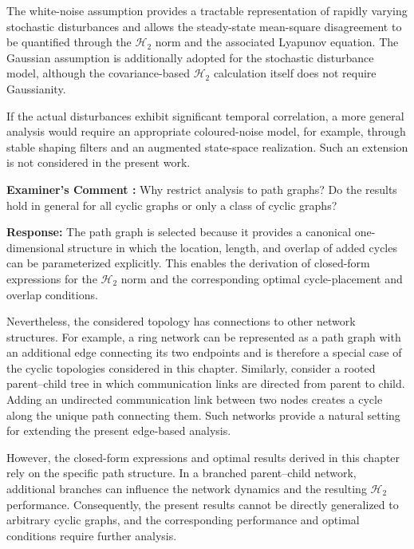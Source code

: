 \documentclass[11pt,a4paper]{article}
\newcounter{examcomment}
\renewcommand{\theexamcomment}{\arabic{examcomment}}
\newcommand{\comment}[1]{%
	\refstepcounter{examcomment}%
	\par\vspace{5pt}\noindent
	\colorbox{gray!13}{%
		\parbox{\dimexpr\linewidth-2\fboxsep}{%
			\textbf{Examiner's Comment \theexamcomment:} #1%
		}%
	}%
	\par
}
\newcounter{problem}
\newcommand{\response}{\par\textbf{Response:} }
\newcommand{\revision}{\par\textbf{Proposed thesis revision:} }
\begin{document}
The white-noise assumption provides a tractable representation of rapidly varying stochastic disturbances and allows the steady-state mean-square disagreement to be quantified through the $\mathcal{H}_2$ norm and the associated Lyapunov equation. The Gaussian assumption is additionally adopted for the stochastic disturbance model, although the covariance-based $\mathcal{H}_2$ calculation itself does not require Gaussianity.

If the actual disturbances exhibit significant temporal correlation, a more general analysis would require an appropriate coloured-noise model, for example, through stable shaping filters and an augmented state-space realization. Such an extension is not considered in the present work.


\comment{Why restrict analysis to path graphs? Do the results hold in general for all cyclic graphs or only a class of cyclic graphs?}
\response
The path graph is selected because it provides a canonical one-dimensional structure in which the location, length, and overlap of added cycles can be parameterized explicitly. This enables the derivation of closed-form expressions for the $\mathcal{H}_2$ norm and the corresponding optimal cycle-placement and overlap conditions.

Nevertheless, the considered topology has connections to other network structures. For example, a ring network can be represented as a path graph with an additional edge connecting its two endpoints and is therefore a special case of the cyclic topologies considered in this chapter. Similarly, consider a rooted parent--child tree in which communication links are directed from parent to child. Adding an undirected communication link between two nodes creates a cycle along the unique path connecting them. Such networks provide a natural setting for extending the present edge-based analysis.

However, the closed-form expressions and optimal results derived in this chapter rely on the specific path structure. In a branched parent--child network, additional branches can influence the network dynamics and the resulting $\mathcal{H}_2$ performance. Consequently, the present results cannot be directly generalized to arbitrary cyclic graphs, and the corresponding performance and optimal conditions require further analysis.
\end{document}
